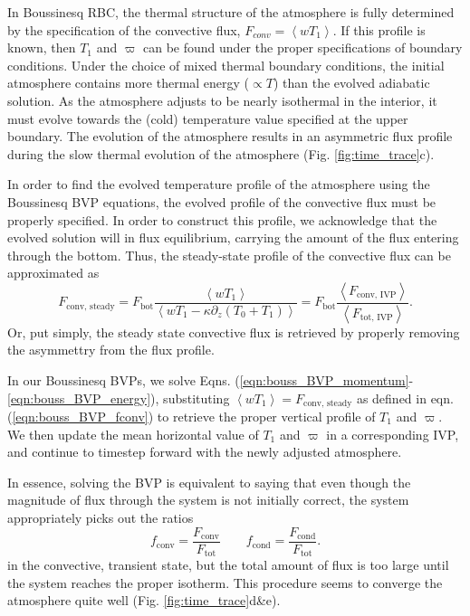 \documentclass[aps, pre, onecolumn, nofootinbib, notitlepage, groupedaddress, amsfonts, amssymb, amsmath, longbibliography]{revtex4-1}
\newcommand{\angles}[1]{\ensuremath{\left\langle #1 \right\rangle}}
\begin{document}
In Boussinesq RBC, the thermal structure of the atmosphere is fully determined by the specification
of the convective flux, $F_{conv} = \angles{w T_1}$.  If this profile is known, then $T_1$ and
$\varpi$ can be found under the proper specifications of boundary conditions.  
Under the choice of mixed thermal boundary conditions, the initial
atmosphere contains more thermal energy ($\propto T$) than the 
evolved adiabatic solution.  As the atmosphere adjusts to be nearly isothermal in the interior,
it must evolve towards the (cold) temperature value specified at the upper boundary.
The evolution of the atmosphere results in an asymmetric flux profile during 
the slow thermal evolution of the atmosphere (Fig. \ref{fig:time_trace}c).  

In order to find the evolved temperature profile of the atmosphere using the Boussinesq BVP equations, 
the evolved profile of the convective flux must be properly specified.  In order to construct
this profile, we acknowledge that the evolved solution will in flux equilibrium, 
carrying the amount of the flux entering through the bottom.  
Thus, the steady-state profile of the convective flux can be approximated as
\begin{equation}
F_{\text{conv, steady}} = F_{\text{bot}}\frac{\angles{wT_1}}{\angles{wT_1 - \kappa \partial_z (T_0 + T_1)}}
= F_{\text{bot}}\frac{\angles{F_{\text{conv, IVP}}}}{\angles{F_{\text{tot, IVP}}}}.
\label{eqn:bouss_BVP_fconv}
\end{equation}
Or, put simply, the steady state convective flux is retrieved by properly removing the asymmettry
from the flux profile.

In our Boussinesq BVPs, we solve Eqns. (\ref{eqn:bouss_BVP_momentum}-\ref{eqn:bouss_BVP_energy}),
substituting $\angles{wT_1} = F_{\text{conv, steady}}$ as defined in eqn. (\ref{eqn:bouss_BVP_fconv})
to retrieve the proper vertical profile of $T_1$ and $\varpi$.  We then update the mean horizontal value
of $T_1$ and $\varpi$ in a corresponding IVP, and continue to timestep forward with the newly adjusted
atmosphere.

In essence, solving the BVP is equivalent to saying that even though the magnitude of flux through
the system is not initially correct, the system appropriately picks out the ratios
\begin{equation}
f_{\text{conv}} = \frac{F_{\text{conv}}}{F_{\text{tot}}}\qquad
f_{\text{cond}} = \frac{F_{\text{cond}}}{F_{\text{tot}}}.
\end{equation}
in the convective, transient state, but the total amount of flux is too large until the system
reaches the proper isotherm.  This procedure seems to converge the atmosphere quite well
(Fig. \ref{fig:time_trace}d\&e).
\end{document}
